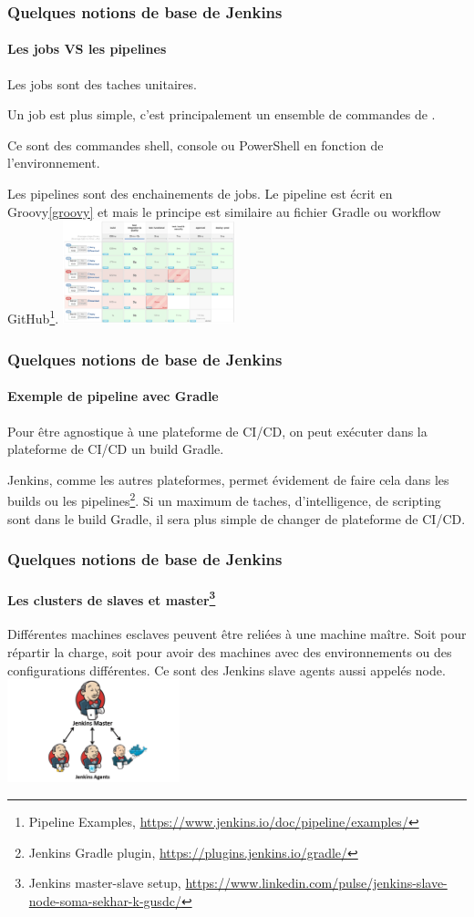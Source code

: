 \documentclass{beamer}
\begin{document}
    \begin{frame}
        \frametitle{Quelques notions de base de Jenkins}
        \framesubtitle{Les jobs VS les pipelines}
        \transdissolve
        Les jobs sont des taches unitaires.

        Un job est plus simple, c'est principalement un ensemble de commandes de .

        Ce sont des commandes shell, console ou PowerShell en fonction de l'environnement.

        \bigbreak
        Les pipelines sont des enchainements de jobs.
        Le pipeline est écrit en Groovy\cref{groovy} et mais le principe est similaire au fichier Gradle ou workflow GitHub\footnote{Pipeline Examples, \url{https://www.jenkins.io/doc/pipeline/examples/}}.
        \bigbreak
        \centering
        \includegraphics[width=5cm]{image/jenkins-pipeline.png}
    \end{frame}

    \begin{frame}
        \frametitle{Quelques notions de base de Jenkins}
        \framesubtitle{Exemple de pipeline avec Gradle}
        \transdissolve
        Pour être agnostique à une plateforme de CI/CD, on peut exécuter dans la plateforme de CI/CD un build Gradle.

        Jenkins, comme les autres plateformes, permet évidement de faire cela dans les builds ou les pipelines\footnote{Jenkins Gradle plugin, \url{https://plugins.jenkins.io/gradle/}}.
        \bigbreak
        Si un maximum de taches, d'intelligence, de scripting sont dans le build Gradle, il sera plus simple de changer de plateforme de CI/CD.
    \end{frame}

    \begin{frame}
        \frametitle{Quelques notions de base de Jenkins}
        \framesubtitle{Les clusters de slaves et master\footnote{Jenkins master-slave setup, \url{https://www.linkedin.com/pulse/jenkins-slave-node-soma-sekhar-k-gusdc/}}}
        \transdissolve
        Différentes machines esclaves peuvent être reliées à une machine maître.
        Soit pour répartir la charge, soit pour avoir des machines avec des environnements ou des configurations différentes.
        Ce sont des Jenkins slave agents aussi appelés node.
        \bigbreak
        \centering
        \includegraphics[width=5cm]{image/jenkins-cluster.png}
    \end{frame}
\end{document}
